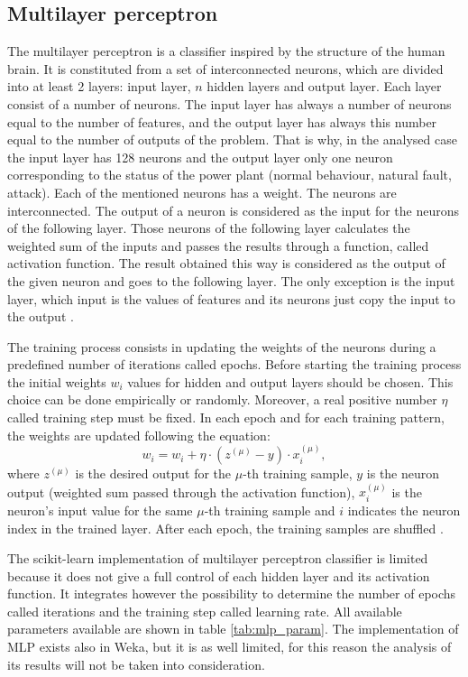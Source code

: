 \subsection{Multilayer perceptron}
The multilayer perceptron is a classifier inspired by the structure of the human brain. It is constituted from a set of interconnected neurons, which are divided into at least 2 layers: input layer, $n$ hidden layers and output layer. Each layer consist of a number of neurons. The input layer has always a number of neurons equal to the number of features, and the output layer has always this number equal to the number of outputs of the problem. That is why, in the analysed case the input layer has 128 neurons and the output layer only one neuron corresponding to the status of the power plant (normal behaviour, natural fault, attack). Each of the mentioned neurons has a weight. The neurons are interconnected. The output of a neuron is considered as the input for the neurons of the following layer. Those neurons of the following layer calculates the weighted sum of the inputs and passes the results through a function, called activation function. The result obtained this way is considered as the output of the given neuron and goes to the following layer. The only exception is the input layer, which input is the values of features and its neurons just copy the input to the output \cite{patel_implementing_2020} \cite{noauthor_neural_nodate} \cite{stokfiszewski_soft_nodate}.

The training process consists in updating the weights of the neurons during a predefined number of iterations called epochs. Before starting the training process the initial weights $w_i$ values for hidden and output layers should be chosen. This choice can be done empirically or randomly. Moreover, a real positive number $\eta$ called training step must be fixed. In each epoch and for each training pattern, the weights are updated following the equation:
\begin{equation}
    w_i = w_i + \eta\cdot (z^{(\mu)}-y) \cdot x_i^{(\mu)},
\end{equation}
where $z^{(\mu)}$ is the desired output for the $\mu$-th training sample, $y$ is the neuron output (weighted sum passed through the activation function), $x_i^{(\mu)}$ is the neuron's input value for the same $\mu$-th training sample and $i$ indicates the neuron index in the trained layer. After each epoch, the training samples are shuffled \cite{stokfiszewski_soft_nodate}. 

The scikit-learn implementation of multilayer perceptron classifier is limited because it does not give a full control of each hidden layer and its activation function. It integrates however the possibility to determine the number of epochs called iterations and the training step called learning rate. All available parameters available are shown in table \ref{tab:mlp_param}. The implementation of MLP exists also in Weka, but it is as well limited, for this reason the analysis of its results will not be taken into consideration.

